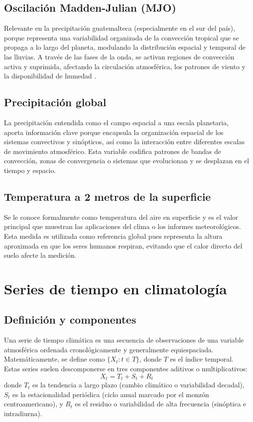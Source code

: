 \subsection{Oscilación Madden-Julian (MJO)} 

Relevante en la precipitación guatemalteca (especialmente en el sur del país), porque representa una variabilidad organizada de la convección tropical que se propaga a lo largo del planeta, modulando la distribución espacial y temporal de las lluvias. A través de las fases de la onda, se activan regiones de convección activa y suprimida, afectando la circulación atmosférica, los patrones de viento y la disponibilidad de humedad \citep{ramos2022influencia, marshall2015madden, zhang2005madden}.

\subsection{Precipitación global}

La precipitación entendida como el campo espacial a una escala planetaria, aporta información clave porque encapsula la organización espacial de los sistemas convectivos y sinópticos, así como la interacción entre diferentes escalas de movimiento atmosférico. Esta variable codifica patrones de bandas de convección, zonas de convergencia o sistemas que evolucionan y se desplazan en el tiempo y espacio.

\subsection{Temperatura a 2 metros de la superficie}

Se le conoce formalmente como temperatura del aire en superficie y es el valor principal que muestran las aplicaciones del clima o los informes meteorológicos. Esta medida es utilizada como referencia global pues representa la altura aproximada en que los seres humanos respiran, evitando que el calor directo del suelo afecte la medición.

\section{Series de tiempo en climatología}

\subsection{Definición y componentes}
Una serie de tiempo climática es una secuencia de observaciones de una variable atmosférica ordenada cronológicamente y generalmente equiespaciada. Matemáticamente, se define como \(\{X_t : t \in T\}\), donde \(T\) es el índice temporal. Estas series suelen descomponerse en tres componentes aditivos o multiplicativos:
\begin{equation}
    X_t = T_t + S_t + R_t
\end{equation}
donde \(T_t\) es la tendencia a largo plazo (cambio climático o variabilidad decadal), \(S_t\) es la estacionalidad periódica (ciclo anual marcado por el monzón centroamericano), y \(R_t\) es el residuo o variabilidad de alta frecuencia (sinóptica e intradiurna).


